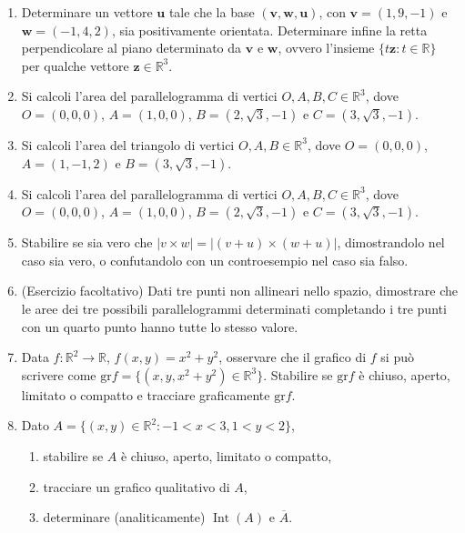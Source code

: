 \begin{enumerate}
	\item Determinare un vettore $\mathbf{u}$ tale che la base $(\mathbf{v}, \mathbf{w}, \mathbf{u})$, con $\mathbf{v} = (1, 9, -1)$ e $\mathbf{w} = (-1, 4, 2)$, sia positivamente orientata. Determinare infine la retta perpendicolare al piano determinato da $\mathbf{v}$ e $\mathbf{w}$, ovvero l'insieme $\{t\mathbf{z} : t \in \mathbb{R}\}$ per qualche vettore $\mathbf{z} \in \mathbb{R}^3$.
	
	\item Si calcoli l'area del parallelogramma di vertici $O, A, B, C \in \mathbb{R}^3$, dove $O = (0, 0, 0)$, $A = (1, 0, 0)$, $B = (2, \sqrt{3}, -1)$ e $C = (3, \sqrt{3}, -1)$.
	
	\item Si calcoli l'area del triangolo di vertici $O, A, B \in \mathbb{R}^3$, dove $O = (0, 0, 0)$, $A = (1, -1, 2)$ e $B = (3, \sqrt{3}, -1)$.
	
	\item Si calcoli l'area del parallelogramma di vertici $O, A, B, C \in \mathbb{R}^3$, dove $O = (0, 0, 0)$, $A = (1, 0, 0)$, $B = (2, \sqrt{3}, -1)$ e $C = (3, \sqrt{3}, -1)$.
	
	\item Stabilire se sia vero che $|v \times w| = |(v + u) \times (w + u)|$, dimostrandolo nel caso sia vero, o confutandolo con un controesempio nel caso sia falso.
	
	\item (Esercizio facoltativo) Dati tre punti non allineari nello spazio, dimostrare che le aree dei tre possibili parallelogrammi determinati completando i tre punti con un quarto punto hanno tutte lo stesso valore.
	
	\item Data $f: \mathbb{R}^2 \to \mathbb{R}$, $f(x, y) = x^2 + y^2$, osservare che il grafico di $f$ si può scrivere come $\mathrm{gr}f = \{(x, y, x^2 + y^2) \in \mathbb{R}^3\}$. Stabilire se $\mathrm{gr}f$ è chiuso, aperto, limitato o compatto e tracciare graficamente $\mathrm{gr}f$.
	
	\item Dato $A = \{(x,y)\in \mathbb{R}^2: -1 < x < 3, 1 < y < 2\}$,
	\begin{enumerate}
		\item stabilire se $A$ è chiuso, aperto, limitato o compatto,
		\item tracciare un grafico qualitativo di $A$,
		\item determinare (analiticamente) $\operatorname{Int}(A)$ e $\overline{A}$.
	\end{enumerate}
	

\end{enumerate}
